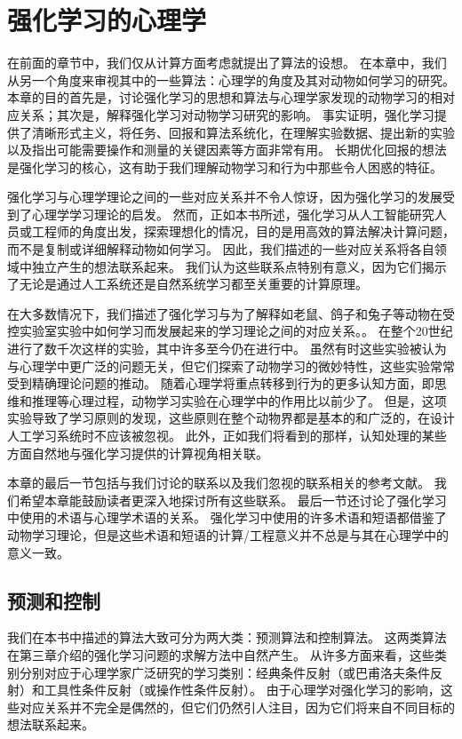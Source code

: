 

\chapter{强化学习的心理学} \label{chap:chap11}

在前面的章节中，我们仅从计算方面考虑就提出了算法的设想。
在本章中，我们从另一个角度来审视其中的一些算法：心理学的角度及其对动物如何学习的研究。
本章的目的首先是，讨论强化学习的思想和算法与心理学家发现的动物学习的相对应关系；其次是，解释强化学习对动物学习研究的影响。
事实证明，强化学习提供了清晰形式主义，将任务、回报和算法系统化，在理解实验数据、提出新的实验以及指出可能需要操作和测量的关键因素等方面非常有用。
长期优化回报的想法是强化学习的核心，这有助于我们理解动物学习和行为中那些令人困惑的特征。


强化学习与心理学理论之间的一些对应关系并不令人惊讶，因为强化学习的发展受到了心理学学习理论的启发。
然而，正如本书所述，强化学习从人工智能研究人员或工程师的角度出发，探索理想化的情况，目的是用高效的算法解决计算问题，而不是复制或详细解释动物如何学习。
因此，我们描述的一些对应关系将各自领域中独立产生的想法联系起来。
我们认为这些联系点特别有意义，因为它们揭示了无论是通过人工系统还是自然系统学习都至关重要的计算原理。


在大多数情况下，我们描述了强化学习与为了解释如老鼠、鸽子和兔子等动物在受控实验室实验中如何学习而发展起来的学习理论之间的对应关系。。
在整个20世纪进行了数千次这样的实验，其中许多至今仍在进行中。
虽然有时这些实验被认为与心理学中更广泛的问题无关，但它们探索了动物学习的微妙特性，这些实验常常受到精确理论问题的推动。
随着心理学将重点转移到行为的更多认知方面，即思维和推理等心理过程，动物学习实验在心理学中的作用比以前少了。
但是，这项实验导致了学习原则的发现，这些原则在整个动物界都是基本的和广泛的，在设计人工学习系统时不应该被忽视。
此外，正如我们将看到的那样，认知处理的某些方面自然地与强化学习提供的计算视角相关联。


本章的最后一节包括与我们讨论的联系以及我们忽视的联系相关的参考文献。
我们希望本章能鼓励读者更深入地探讨所有这些联系。
最后一节还讨论了强化学习中使用的术语与心理学术语的关系。
强化学习中使用的许多术语和短语都借鉴了动物学习理论，但是这些术语和短语的计算/工程意义并不总是与其在心理学中的意义一致。


\section{预测和控制}


我们在本书中描述的算法大致可分为两大类：预测算法和控制算法。
这两类算法在第三章介绍的强化学习问题的求解方法中自然产生。
从许多方面来看，这些类别分别对应于心理学家广泛研究的学习类别：经典条件反射（或巴甫洛夫条件反射）和工具性条件反射（或操作性条件反射）。
由于心理学对强化学习的影响，这些对应关系并不完全是偶然的，但它们仍然引人注目，因为它们将来自不同目标的想法联系起来。


